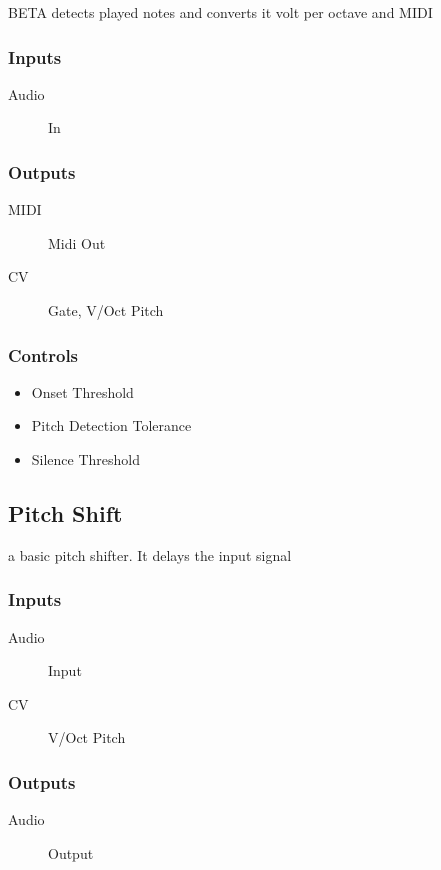 BETA detects played notes and converts it volt per octave and MIDI



\subsubsection{Inputs}
\begin{description}
\item [Audio] In
\end{description}

\subsubsection{Outputs}
\begin{description}
\item [MIDI] Midi Out
\item [CV] Gate, V/Oct Pitch
\end{description}

\subsubsection{Controls}
\begin{itemize}
\item Onset Threshold
\item Pitch Detection Tolerance
\item Silence Threshold
\end{itemize}

\subsection{Pitch Shift}

a basic pitch shifter. It delays the input signal



\subsubsection{Inputs}
\begin{description}
\item [Audio] Input
\item [CV] V/Oct Pitch
\end{description}

\subsubsection{Outputs}
\begin{description}
\item [Audio] Output
\end{description}

